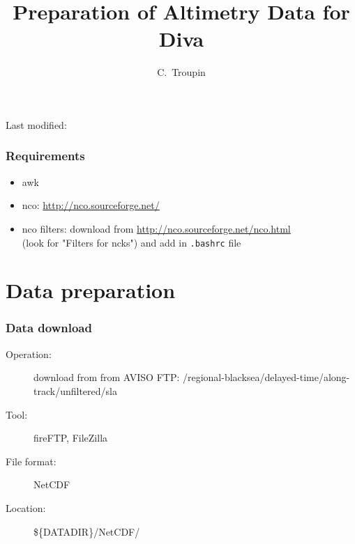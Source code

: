 
\usepackage{times}

\newcommand\quelle[1]{{%
      \unskip\nobreak\hfil\penalty50
      \hskip2em\hbox{}\nobreak\hfil\textbf{#1}%
      \parfillskip=0pt \finalhyphendemerits=0 \par}}

\parindent 0cm

\title{Preparation of Altimetry Data for Diva}
\author{C.~Troupin}
\date{}



\begin{frame}[fragile]
\centering

\maketitle
Last modified: \currenttime

\end{frame}



\begin{frame}
\frametitle{Requirements}
\footnotesize

\begin{itemize}
\item[\checkmark] awk
\item[\checkmark] nco: \url{http://nco.sourceforge.net/}
\item[\checkmark] nco filters: download from \url{http://nco.sourceforge.net/nco.html}\\ (look for "Filters for ncks") and add in \texttt{.bashrc} file
\end{itemize}

\end{frame}
\section{Data preparation}
\begin{frame}
\frametitle{Data download}
\footnotesize
\begin{description}
\item[Operation:] download from from AVISO FTP: /regional-blacksea/delayed-time/along-track/unfiltered/sla
\item[Tool:] fireFTP, FileZilla
\item[File format:] NetCDF
\item[Location:] \$\{DATADIR\}/NetCDF/ 
\end{description}
\end{frame}

